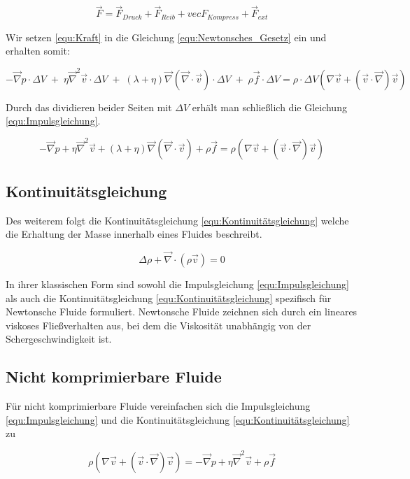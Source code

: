 \documentclass[a4paper, 12pt]{article}
\begin{document}
\begin{equation} \label{equ:Kraft}
	\vec{F} = \vec{F}_{Druck} + \vec{F}_{Reib} + vec{F}_{Kompress} + \vec{F}_{ext}
\end{equation}

Wir setzen \eqref{equ:Kraft} in die Gleichung \eqref{equ:Newtonsches_Gesetz} ein und erhalten somit:

\[- \vec{\nabla}p \cdot \Delta V\;+\;\eta \vec{\nabla}^2 \vec{v} \cdot \Delta V\;+\;(\lambda + \eta)\vec{\nabla}(\vec{\nabla} \cdot \vec{v}) \cdot \Delta V\;+\;\rho \vec{f} \cdot \Delta V = \rho \cdot \Delta V (\nabla \vec{v} + (\vec{v} \cdot \vec{\nabla})\vec{v})\]

Durch das dividieren beider Seiten mit $\Delta V$ erhält man schließlich die Gleichung \eqref{equ:Impulsgleichung}.

\[- \vec{\nabla}p + \eta \vec{\nabla}^2 \vec{v} + (\lambda + \eta)\vec{\nabla}(\vec{\nabla} \cdot \vec{v}) + \rho \vec{f} = \rho (\nabla \vec{v} + (\vec{v} \cdot \vec{\nabla})\vec{v})\]

\subsection{Kontinuitätsgleichung}
Des weiterem folgt die Kontinuitätsgleichung \eqref{equ:Kontinuitätsgleichung} welche die Erhaltung der Masse innerhalb eines Fluides beschreibt.

\begin{equation} \label{equ:Kontinuitätsgleichung}
	\Delta \rho + \vec{\nabla} \cdot (\rho \vec{v}) = 0
\end{equation}

In ihrer klassischen Form sind sowohl die Impulsgleichung \eqref{equ:Impulsgleichung} als auch die Kontinuitätsgleichung \eqref{equ:Kontinuitätsgleichung} spezifisch für Newtonsche Fluide formuliert. Newtonsche Fluide zeichnen sich durch ein lineares viskoses Fließverhalten aus, bei dem die Viskosität unabhängig von der Schergeschwindigkeit ist.

\subsection{Nicht komprimierbare Fluide}
Für nicht komprimierbare Fluide vereinfachen sich die Impulsgleichung \eqref{equ:Impulsgleichung} und die Kontinuitätsgleichung \eqref{equ:Kontinuitätsgleichung} zu

\begin{equation} \label{equ:einfachImpulsgleichung}
	\rho(\nabla \vec{v} + (\vec{v} \cdot \vec{\nabla})\vec{v}) = - \vec{\nabla}p + \eta \vec{\nabla}^2 \vec{v} + \rho \vec{f}
\end{equation}
\end{document}
